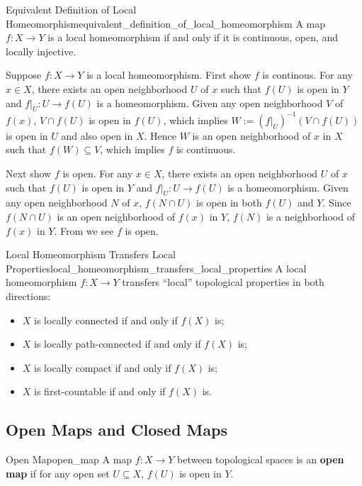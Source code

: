 \documentclass{report}
\begin{document}
\begin{proposition}{Equivalent Definition of Local Homeomorphism}{equivalent_definition_of_local_homeomorphism}
	A map $f:X\to Y$ is a local homeomorphism if and only if it is continuous, open, and locally injective.
\end{proposition}
\begin{prf}
	Suppose $f:X\to Y$ is a local homeomorphism. First show 
	$f$ is continous. For any $x\in X$, there exists an open neighborhood $U$ of $x$ such that $f(U)$ is open in $Y$ and $f|_U:U\to f(U)$ is a homeomorphism. Given any open neighborhood $V$ of $f(x)$, $V\cap f(U)$ is open in $f(U)$, which implies $W:=(f|_U)^{-1}(V\cap f(U))$ is open in $U$ and also open in $X$. Hence $W$ is an open neighborhood of $x$ in $X$ such that $f(W)\subseteq V$, which implies $f$ is continuous.

	Next show $f$ is open. For any $x\in X$, there exists an open neighborhood $U$ of $x$ such that $f(U)$ is open in $Y$ and $f|_U:U\to f(U)$ is a homeomorphism. Given any open neighborhood $N$ of $x$, $f(N \cap U)$ is open in both $f(U)$ and $Y$. Since $f(N\cap U)$ is an open neighborhood of $f(x)$ in $Y$, $f(N)$ is a neighborhood of $f(x)$ in $Y$. From  we see $f$ is open.
\end{prf}

\begin{proposition}{Local Homeomorphism Transfers Local Properties}{local_homeomorphism_transfers_local_properties}
	A local homeomorphism $f: X \rightarrow Y$ transfers ``local'' topological properties in both directions:
	\begin{itemize}
		\item $X$ is locally connected if and only if $f(X)$ is;
		\item  $X$ is locally path-connected if and only if $f(X)$ is;
		\item  $X$ is locally compact if and only if $f(X)$ is;
		\item  $X$ is first-countable if and only if $f(X)$ is.
	\end{itemize}
\end{proposition}


\subsection{Open Maps and Closed Maps}

\begin{definition}{Open Map}{open_map}
	A map $f:X\to Y$ between topological spaces is an \textbf{open map} if for any open set $U\subseteq X$, $f(U)$ is open in $Y$.
\end{definition}
\end{document}
